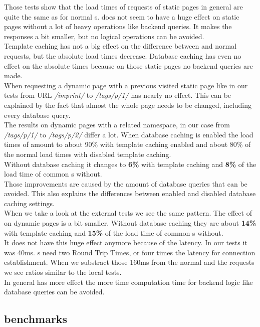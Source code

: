 \noindent{}Those tests show that the load times of \lare{} requests of static pages in general are quite the same as for normal \httpRequest{}s.
\lare{} does not seem to have a huge effect on static pages without a lot of heavy operations like backend queries. It makes the responses a bit smaller, but no logical operations can be avoided.
\\
Template caching has not a big effect on the difference between \lare{} and normal requests, but the absolute load times decrease.
Database caching has even no effect on the absolute times because on those static pages no backend queries are made.
\\
When requesting a dynamic page with a previous visited static page like in our tests from URL \emph{/imprint/} to \emph{/tags/p/1/} \lare{} has nearly no effect.
This can be explained by the fact that almost the whole page needs to be changed, including every database query.
\\
The results on dynamic pages with a related namespace, in our case from \emph{/tags/p/1/} to \emph{/tags/p/2/} differ a lot.
When database caching is enabled the load times of \lare{} amount to about 90\% with template caching enabled and about 80\% of the normal load times with disabled template caching.
\\
Without database caching it changes to \textbf{6\%} with template caching and \textbf{8\%} of the load time of common \httpRequest{}s without.
\\
Those improvements are caused by the amount of database queries that can be avoided.
This also explains the differences between enabled and disabled database caching settings.
\\
When we take a look at the external tests we see the same pattern.
The effect of \lare{} on dynamic pages is a bit smaller.
Without database caching they are about \textbf{14\%} with template caching and \textbf{15\%} of the load time of common \httpRequest{}s without.
\\
It does not have this huge effect anymore because of the latency.
In our tests it was 40ms.
\httpRequest{}s need two Round Trip Times, or four times the latency for connection establishment.
When we substract those 160ms from the normal and the \lare{} requests we see ratios similar to the local tests.
\\
In general \lare{} has more effect the more time computation time for backend logic like database queries can be avoided.

\subsection{\selenium{} benchmarks\label{selenium}}

